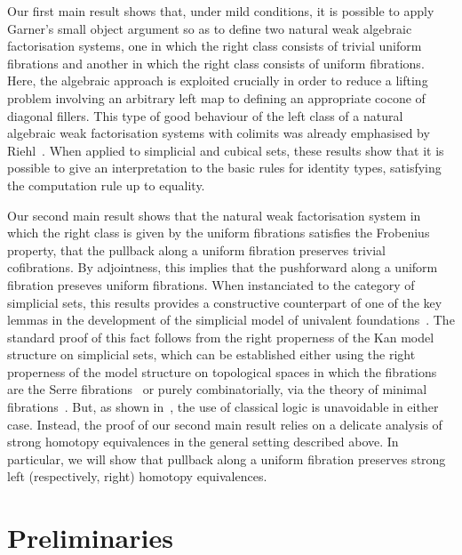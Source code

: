 \documentclass[reqno,10pt,a4paper,oneside]{amsart}
\begin{document}
Our first main result shows that, under mild conditions, it is possible to apply Garner's small
object argument so as to define two natural weak algebraic factorisation systems, one in which 
the right class consists of trivial uniform fibrations and another in which the right class consists of
uniform fibrations. Here, the algebraic approach is exploited crucially in order to reduce a lifting
problem involving an arbitrary left map to defining an appropriate cocone of diagonal fillers. This 
type of good behaviour of the left class of a natural algebraic weak factorisation systems with 
colimits was already emphasised by Riehl~\cite{riehl-cat-homotopy}. When applied to 
simplicial and cubical sets, these results show that it is possible to give an interpretation to
the basic rules for identity types, satisfying the computation rule up to equality.

Our second main result shows that the natural weak factorisation system in which the right
class is given by the uniform fibrations satisfies the Frobenius property, \ie that the pullback
along a uniform fibration preserves trivial cofibrations. By adjointness, this implies that the
pushforward along a uniform fibration preseves uniform fibrations. When instanciated to
the category of simplicial sets, this results provides a constructive counterpart of one of
the key lemmas in the development of the simplicial model of univalent 
foundations~\cite[Lemma 2.3.1]{voevodsky-simplicial-model}. The standard proof of
this fact follows from the right properness of the Kan model structure on simplicial
sets, which can be established either using the right properness of the model structure on topological spaces in which
  the fibrations are the Serre fibrations~\cite[Theorem~13.1.13]{hirschhorn-model-localizations} or purely combinatorially, via the theory of minimal fibrations~\cite[Theorem~1.7.1]{joyal-tierney-notes}. But, as shown in~\cite{coquand-non-constructivity-kan}, the use of classical logic is unavoidable in either case. 
Instead, the proof of our second main result relies on a delicate analysis of strong homotopy equivalences
in the general setting described above. In particular, we will show that pullback along a uniform
fibration preserves strong left (respectively, right) homotopy equivalences.



\section{Preliminaries}
\end{document}
